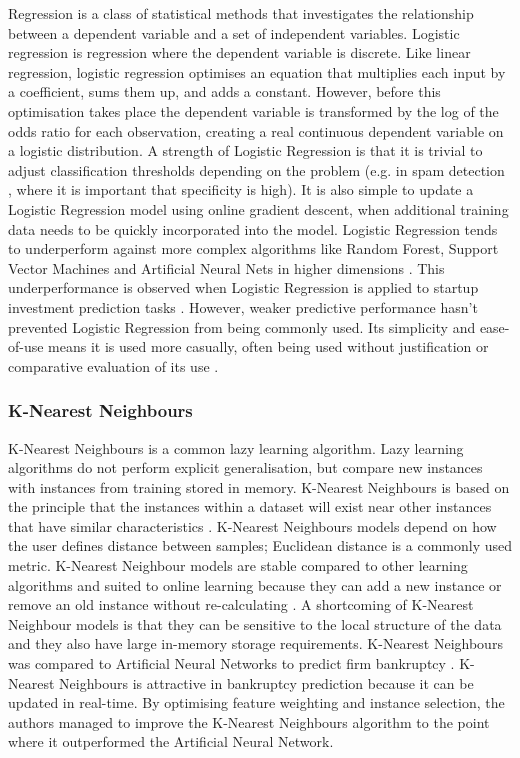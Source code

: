\documentclass[../thesis/thesis.tex]{subfiles}
\begin{document}
Regression is a class of statistical methods that investigates the relationship between a dependent variable and a set of independent variables. Logistic regression is regression where the dependent variable is discrete. Like linear regression, logistic regression optimises an equation that multiplies each input by a coefficient, sums them up, and adds a constant. However, before this optimisation takes place the dependent variable is transformed by the log of the odds ratio for each observation, creating a real continuous dependent variable on a logistic distribution. A strength of Logistic Regression is that it is trivial to adjust classification thresholds depending on the problem (e.g. in spam detection \cite{friedman2001}, where it is important that specificity is high). It is also simple to update a Logistic Regression model using online gradient descent, when additional training data needs to be quickly incorporated into the model. Logistic Regression tends to underperform against more complex algorithms like Random Forest, Support Vector Machines and Artificial Neural Nets in higher dimensions \cite{caruana2008}. This underperformance is observed when Logistic Regression is applied to startup investment prediction tasks \cite{beckwith2016, bhat2011}. However, weaker predictive performance hasn't prevented Logistic Regression from being commonly used. Its simplicity and ease-of-use means it is used more casually, often being used without justification or comparative evaluation of its use \cite{gimmon2010, huang2015}.

\subsubsection{K-Nearest Neighbours}

K-Nearest Neighbours is a common lazy learning algorithm. Lazy learning algorithms do not perform explicit generalisation, but compare new instances with instances from training stored in memory. K-Nearest Neighbours is based on the principle that the instances within a dataset will exist near other instances that have similar characteristics \cite{cover1967}. K-Nearest Neighbours models depend on how the user defines distance between samples; Euclidean distance is a commonly used metric. K-Nearest Neighbour models are stable compared to other learning algorithms and suited to online learning because they can add a new instance or remove an old instance without re-calculating \cite{kotsiantis2007}. A shortcoming of K-Nearest Neighbour models is that they can be sensitive to the local structure of the data and they also have large in-memory storage requirements. K-Nearest Neighbours was compared to Artificial Neural Networks to predict firm bankruptcy \cite{ahn2008}. K-Nearest Neighbours is attractive in bankruptcy prediction because it can be updated in real-time. By optimising feature weighting and instance selection, the authors managed to improve the K-Nearest Neighbours algorithm to the point where it outperformed the Artificial Neural Network.
\end{document}

